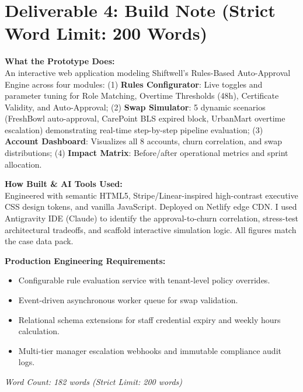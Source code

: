 \documentclass[10pt,a4paper]{article}
\begin{document}
\newpage
\enlargethispage{1.5\baselineskip}

\section*{Deliverable 4: Build Note (Strict Word Limit: 200 Words)}

\begin{neutralcard}
\footnotesize
\textbf{What the Prototype Does:}\\
An interactive web application modeling Shiftwell's Rules-Based Auto-Approval Engine across four modules: (1) \textbf{Rules Configurator}: Live toggles and parameter tuning for Role Matching, Overtime Thresholds (48h), Certificate Validity, and Auto-Approval; (2) \textbf{Swap Simulator}: 5 dynamic scenarios (FreshBowl auto-approval, CarePoint BLS expired block, UrbanMart overtime escalation) demonstrating real-time step-by-step pipeline evaluation; (3) \textbf{Account Dashboard}: Visualizes all 8 accounts, churn correlation, and swap distributions; (4) \textbf{Impact Matrix}: Before/after operational metrics and sprint allocation.

\textbf{How Built \& AI Tools Used:}\\
Engineered with semantic HTML5, Stripe/Linear-inspired high-contrast executive CSS design tokens, and vanilla JavaScript. Deployed on Netlify edge CDN. I used Antigravity IDE (Claude) to identify the approval-to-churn correlation, stress-test architectural tradeoffs, and scaffold interactive simulation logic. All figures match the case data pack.

\textbf{Production Engineering Requirements:}\\
\begin{itemize}[leftmargin=12pt]
    \item Configurable rule evaluation service with tenant-level policy overrides.
    \item Event-driven asynchronous worker queue for swap validation.
    \item Relational schema extensions for staff credential expiry and weekly hours calculation.
    \item Multi-tier manager escalation webhooks and immutable compliance audit logs.
\end{itemize}
\end{neutralcard}
\vspace{-2mm}
\begin{flushright}
\scriptsize\textit{Word Count: 182 words (Strict Limit: 200 words)}
\end{flushright}
\end{document}
